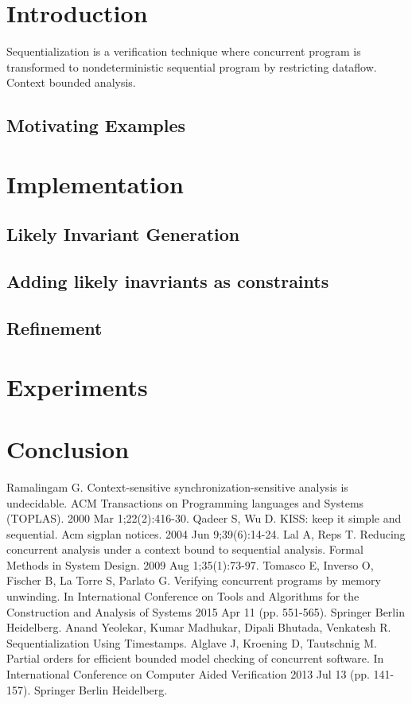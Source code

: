 \documentclass{llncs}
\begin{document}
\section{Introduction}
Sequentialization is a verification technique where concurrent program is transformed to nondeterministic 
sequential program by restricting dataflow. Context bounded analysis.

\subsection{Motivating Examples}

\section {Implementation}

\subsection {Likely Invariant Generation}
\subsection {Adding likely inavriants as constraints}
\subsection {Refinement}
\section {Experiments}

\section {Conclusion}

\begin{thebibliography}{4}
%
Ramalingam G. Context-sensitive synchronization-sensitive analysis is undecidable. 
ACM Transactions on Programming languages and Systems (TOPLAS). 2000 Mar 1;22(2):416-30.
%
Qadeer S, Wu D. KISS: keep it simple and sequential. Acm sigplan notices. 2004 Jun 9;39(6):14-24.
%
Lal A, Reps T. Reducing concurrent analysis under a context bound to sequential analysis. 
Formal Methods in System Design. 2009 Aug 1;35(1):73-97.
%
Tomasco E, Inverso O, Fischer B, La Torre S, Parlato G. 
Verifying concurrent programs by memory unwinding. 
In International Conference on Tools and Algorithms for the Construction and Analysis of 
Systems 2015 Apr 11 (pp. 551-565). Springer Berlin Heidelberg.
%
Anand Yeolekar, Kumar Madhukar, Dipali Bhutada, Venkatesh R.
Sequentialization Using Timestamps.
%
Alglave J, Kroening D, Tautschnig M. 
Partial orders for efficient bounded model checking of concurrent software. 
In International Conference on Computer Aided Verification 2013 Jul 13 (pp. 141-157). 
Springer Berlin Heidelberg.
%
\end{thebibliography}
\end{document}
